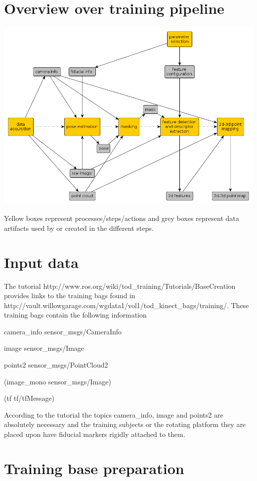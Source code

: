 \section*{Overview over training pipeline}

\includegraphics[width=\textwidth]{../doc/tod_training}

Yellow boxes represent processes/steps/actions and grey boxes represent data
artifacts used by or created in the different steps.

\section*{Input data}

The tutorial http://www.ros.org/wiki/tod\_training/Tutorials/BaseCreation
provides links to the training bags found in
http://vault.willowgarage.com/wgdata1/vol1/tod\_kinect\_bags/training/. These
training bags contain the following information

camera\_info     sensor\_msgs/CameraInfo

image               sensor\_msgs/Image

points2         sensor\_msgs/PointCloud2

(image\_mono sensor\_msgs/Image)

(tf                 tf/tfMessage)

According to the tutorial the topics camera\_info, image and points2 are
absolutely necessary and the training subjects or the rotating platform they
are placed upon have fiducial markers rigidly attached to them.

\section*{Training base preparation}

